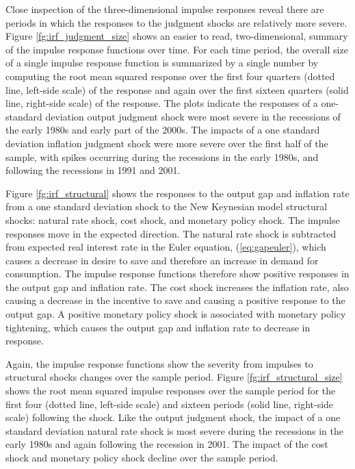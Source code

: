 \documentclass[10pt]{article}
\begin{document}
{Close inspection of the three-dimensional impulse responses reveal there are periods in which the responses to the judgment shocks are relatively more severe.  Figure \ref{fg:irf_judgment_size} shows an easier to read, two-dimensional, summary of the impulse response functions over time.  For each time period, the overall size of a single impulse response function is summarized by a single number by computing the root mean squared response over the first four quarters (dotted line, left-side scale) of the response and again over the first sixteen quarters (solid line, right-side scale) of the response.  The plots indicate the responses of a one-standard deviation output judgment shock were most severe in the recessions of the early 1980s and early part of the 2000s.  The impacts of a one standard deviation inflation judgment shock were more severe over the first half of the sample, with spikes occurring during the recessions in the early 1980s, and following the recessions in 1991 and 2001.

Figure \ref{fg:irf_structural} shows the responses to the output gap and inflation rate from a one standard deviation shock to the New Keynesian model structural shocks: natural rate shock, cost shock, and monetary policy shock.  The impulse responses move in the expected direction.  The natural rate shock is subtracted from expected real interest rate in the Euler equation, (\ref{eq:gapeuler}), which causes a decrease in desire to save and therefore an increase in demand for consumption.  The impulse response functions therefore show positive responses in the output gap and inflation rate.  The cost shock increases the inflation rate, also causing a decrease in the incentive to save and causing a positive response to the output gap.  A positive monetary policy shock is associated with monetary policy tightening, which causes the output gap and inflation rate to decrease in response.

Again, the impulse response functions show the severity from impulses to structural shocks changes over the sample period.  Figure \ref{fg:irf_structural_size} shows the root mean squared impulse responses over the sample period for the first four (dotted line, left-side scale) and sixteen periods (solid line, right-side scale) following the shock.  Like the output judgment shock, the impact of a one standard deviation natural rate shock is most severe during the recessions in the early 1980s and again following the recession in 2001.  The impact of the cost shock and monetary policy shock decline over the sample period.

}
\end{document}
